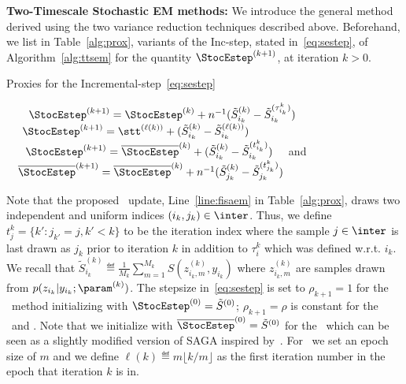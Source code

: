 \documentclass[bj]{imsart}
\numberwithin{equation}{section}
\theoremstyle{plain}
\begin{document}
\medskip
\noindent \textbf{Two-Timescale Stochastic EM methods:}
We introduce the general method derived using the two variance reduction techniques described above.
Beforehand, we list in Table~\ref{alg:prox}, variants of the {Inc-step}, stated in~\eqref{eq:sestep}, of Algorithm~\ref{alg:ttsem} for the quantity $\StocEstep^{(k+1)}$, at iteration $k >0$.

 \begin{protocol}[H]
\caption{Proxies for the Incremental-step~\eqref{eq:sestep}}\label{alg:prox}
  \begin{algorithmic}[1]
  \STATE {\ISAEM\ }$\hspace{0.7cm} \StocEstep^{(k+1)} = \StocEstep^{(k)} + n^{-1} ( \tilde{S}_{i_k}^{(k)}  - \tilde{S}_{i_k}^{(\tau_{i_k}^k)} ) \label{eq:isaem}$
    \STATE {\SAEMVR\ }$\hspace{0.5cm} \StocEstep^{(k+1)}  = \stt^{(\ell(k))} +  ( \tilde{S}_{i_k}^{(k)}  -\tilde{S}_{i_k}^{(\ell(k))} ) \label{eq:vrsaem}$
      \STATE {\FISAEM\ }$\hspace{0.6cm} \StocEstep^{(k+1)} = \overline{\StocEstep}^{(k)} + ( \tilde{S}_{i_k}^{(k)}  - \tilde{S}_{i_k}^{(t_{i_k}^k)} )\quad \label{eq:fisaem}$ and
             $ \quad \overline{\StocEstep}^{(k+1)} = \overline{\StocEstep}^{(k)} + n^{-1} ( \tilde{S}_{j_k}^{(k)}  - \tilde{S}_{j_k}^{(t_{j_k}^k)} )$ \label{line:fisaem}
  \end{algorithmic}
\end{protocol}

Note that the proposed \FISAEM\ update, Line~\ref{line:fisaem} in Table~\ref{alg:prox}, draws {two} {independent} and {uniform} indices $(i_k, j_k) \in \inter$. 
Thus, we define $t_j^k = \{ k' : j_{k'} = j , k' < k \}$ to be the iteration index where the sample $j \in \inter$ is last drawn as $j_k$ prior to iteration $k$ in addition to $\tau_i^k$ which was defined w.r.t. $i_k$.
We recall that $\tilde{S}_{i_k}^{(k)} \eqdef  \frac{1}{M_k} \sum_{m=1}^{M_k} S(z_{i_k,m}^{(k)}, y_{i_k})$ where $z_{i_k,m}^{(k)}$ are samples drawn from $ p(z_{i_k}|y_{i_k};\param^{(k)})$.
The stepsize in~\eqref{eq:sestep} is set to $\rho_{k+1} = 1$ for the \ISAEM\ method initializing with $\StocEstep^{(0)} = \tilde{S}^{(0)}$; $\rho_{k+1} = \rho$ is  constant for the \SAEMVR\ and \FISAEM. 
Note that we initialize with $\overline{\StocEstep}^{(0)} = \tilde{S}^{(0)}$ for the \FISAEM\ which can be seen as a slightly modified version of SAGA inspired by~\citet{reddi2016fast}.
For \SAEMVR\, we set an epoch size of $m$ and we define $\ell(k) \eqdef m \lfloor k/m \rfloor$ as the first iteration number in the epoch that iteration $k$ is in.
\end{document}
